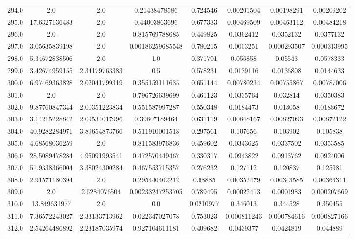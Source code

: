 \begin{longtable}{|c|c|c|c|c|c|c|c|}
294.0 & 2.0 & 2.0 & 0.21438478586 & 0.724546 & 0.00201504 & 0.00198291 & 0.00209202 \\
295.0 & 17.6327136483 & 2.0 & 0.44003863696 & 0.677333 & 0.00469509 & 0.00463112 & 0.00484218 \\
296.0 & 2.0 & 2.0 & 0.815769788685 & 0.449825 & 0.0362412 & 0.0352132 & 0.0377132 \\
297.0 & 3.05635839198 & 2.0 & 0.00186259685548 & 0.780215 & 0.0003251 & 0.000293507 & 0.000313995 \\
298.0 & 5.34672838506 & 2.0 & 1.0 & 0.371791 & 0.056858 & 0.05543 & 0.0578333 \\
299.0 & 3.42674959155 & 2.34179763383 & 0.5 & 0.578231 & 0.0139116 & 0.0136808 & 0.0144633 \\
300.0 & 6.97469363828 & 2.02041799319 & 0.355159111635 & 0.651144 & 0.00780234 & 0.00755867 & 0.00787006 \\
301.0 & 2.0 & 2.0 & 0.796726639699 & 0.461123 & 0.0335764 & 0.032814 & 0.0350383 \\
302.0 & 9.87760847344 & 2.00351223834 & 0.551587997287 & 0.550348 & 0.0184473 & 0.018058 & 0.0188672 \\
303.0 & 3.14215228842 & 2.09534017996 & 0.39807189464 & 0.631119 & 0.00848167 & 0.00827093 & 0.00872122 \\
304.0 & 40.9282284971 & 3.89654873766 & 0.511910001518 & 0.297561 & 0.107656 & 0.103902 & 0.105838 \\
305.0 & 4.68568036259 & 2.0 & 0.811583976836 & 0.459602 & 0.0343625 & 0.0337502 & 0.0353585 \\
306.0 & 28.5089478284 & 4.95091993541 & 0.472570449467 & 0.330317 & 0.0943822 & 0.0913762 & 0.0924006 \\
307.0 & 51.9338366004 & 3.38024300284 & 0.467553715357 & 0.276232 & 0.127112 & 0.120837 & 0.125981 \\
308.0 & 2.91571180394 & 2.0 & 0.295440402212 & 0.68885 & 0.00352479 & 0.00343585 & 0.00363311 \\
309.0 & 2.0 & 2.5284076504 & 0.00233247253705 & 0.789495 & 0.00022413 & 0.0001983 & 0.000207669 \\
310.0 & 13.849631977 & 2.0 & 0.0 & 0.0210977 & 0.346013 & 0.344528 & 0.350455 \\
311.0 & 7.36572243027 & 2.33133713962 & 0.022347027078 & 0.753023 & 0.000811243 & 0.000784616 & 0.000827166 \\
312.0 & 2.54264486892 & 2.23187035974 & 0.927104611181 & 0.409682 & 0.0439377 & 0.0424819 & 0.044889 \\

\end{longtable}
